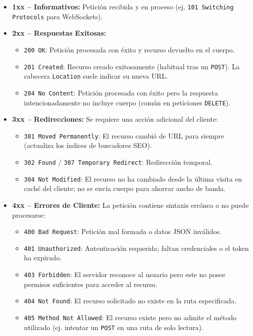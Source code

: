 \begin{itemize}[leftmargin=1.2cm]
  \item \textbf{1xx -- Informativos:} Petición recibida y en proceso (ej. \texttt{101 Switching Protocols} para WebSockets).
  \item \textbf{2xx -- Respuestas Exitosas:}
    \begin{itemize}
      \item \texttt{200 OK}: Petición procesada con éxito y recurso devuelto en el cuerpo.
      \item \texttt{201 Created}: Recurso creado exitosamente (habitual tras un \texttt{POST}). La cabecera \texttt{Location} suele indicar su nueva URL.
      \item \texttt{204 No Content}: Petición procesada con éxito pero la respuesta intencionadamente no incluye cuerpo (común en peticiones \texttt{DELETE}).
    \end{itemize}
  \item \textbf{3xx -- Redirecciones:} Se requiere una acción adicional del cliente:
    \begin{itemize}
      \item \texttt{301 Moved Permanently}: El recurso cambió de URL para siempre (actualiza los índices de buscadores SEO).
      \item \texttt{302 Found} / \texttt{307 Temporary Redirect}: Redirección temporal.
      \item \texttt{304 Not Modified}: El recurso no ha cambiado desde la última visita en caché del cliente; no se envía cuerpo para ahorrar ancho de banda.
    \end{itemize}
  \item \textbf{4xx -- Errores de Cliente:} La petición contiene sintaxis errónea o no puede procesarse:
    \begin{itemize}
      \item \texttt{400 Bad Request}: Petición mal formada o datos JSON inválidos.
      \item \texttt{401 Unauthorized}: Autenticación requerida; faltan credenciales o el token ha expirado.
      \item \texttt{403 Forbidden}: El servidor reconoce al usuario pero este no posee permisos suficientes para acceder al recurso.
      \item \texttt{404 Not Found}: El recurso solicitado no existe en la ruta especificada.
      \item \texttt{405 Method Not Allowed}: El recurso existe pero no admite el método utilizado (ej. intentar un \texttt{POST} en una ruta de solo lectura).

\end{itemize}
\end{itemize}
